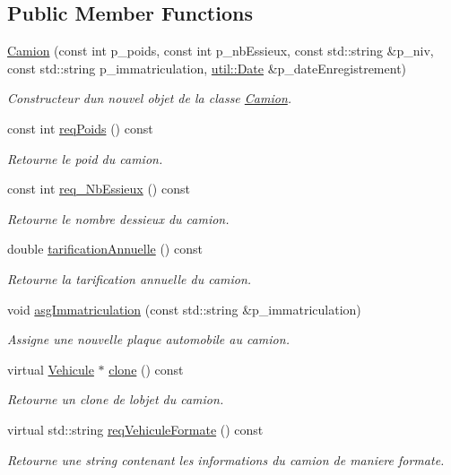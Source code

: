 \subsection*{Public Member Functions}
\begin{DoxyCompactItemize}
\item 
\hyperlink{classsaaq_1_1Camion_ab81877c7ca4c636c4488c09a6b7fabba}{Camion} (const int p\+\_\+poids, const int p\+\_\+nb\+Essieux, const std\+::string \&p\+\_\+niv, const std\+::string p\+\_\+immatriculation, \hyperlink{classutil_1_1Date}{util\+::\+Date} \&p\+\_\+date\+Enregistrement)
\begin{DoxyCompactList}\small\item\em Constructeur d\textquotesingle{}un nouvel objet de la classe \hyperlink{classsaaq_1_1Camion}{Camion}. \end{DoxyCompactList}\item 
const int \hyperlink{classsaaq_1_1Camion_ab024fec200c2aa4484645da93155cdd2}{req\+Poids} () const
\begin{DoxyCompactList}\small\item\em Retourne le poid du camion. \end{DoxyCompactList}\item 
const int \hyperlink{classsaaq_1_1Camion_aeac12d82162c95755096025f93c8ddb7}{req\+\_\+\+Nb\+Essieux} () const
\begin{DoxyCompactList}\small\item\em Retourne le nombre d\textquotesingle{}essieux du camion. \end{DoxyCompactList}\item 
double \hyperlink{classsaaq_1_1Camion_af01bdc48db3cdeb3bc29c8b864ffdad8}{tarification\+Annuelle} () const
\begin{DoxyCompactList}\small\item\em Retourne la tarification annuelle du camion. \end{DoxyCompactList}\item 
void \hyperlink{classsaaq_1_1Camion_aff39f0171afe70b4a9168ebefba775b5}{asg\+Immatriculation} (const std\+::string \&p\+\_\+immatriculation)
\begin{DoxyCompactList}\small\item\em Assigne une nouvelle plaque automobile au camion. \end{DoxyCompactList}\item 
virtual \hyperlink{classsaaq_1_1Vehicule}{Vehicule} $\ast$ \hyperlink{classsaaq_1_1Camion_aa4fe639e82878acf3fe578a8d80870d4}{clone} () const
\begin{DoxyCompactList}\small\item\em Retourne un clone de l\textquotesingle{}objet du camion. \end{DoxyCompactList}\item 
virtual std\+::string \hyperlink{classsaaq_1_1Camion_a7e352c9d011c145497fa19d16482bd9a}{req\+Vehicule\+Formate} () const
\begin{DoxyCompactList}\small\item\em Retourne une string contenant les informations du camion de maniere formate. \end{DoxyCompactList}\end{DoxyCompactItemize}
